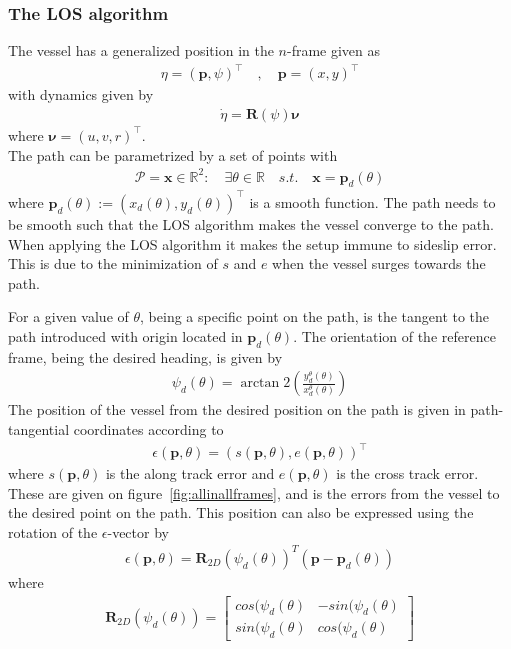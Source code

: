 \subsubsection{The \ac{LOS} algorithm}
The vessel has a generalized position in the ${n}$-frame given as
\begin{align}
\eta = (\textbf{p},\psi)^\top\quad , \quad \textbf{p} = (x,y)^\top
\end{align}
with dynamics given by
\begin{align}
\dot{\eta} = \textbf{R}(\psi)\boldsymbol{\nu}
\end{align}
where $\boldsymbol{\nu} = (u,v,r)^\top$.\\
The path can be parametrized by a set of points with
\begin{align}
\mathcal{P} = {\textbf{x}}\in\mathds{R}^2 : \quad \exists \theta \in \mathds{R} \quad s.t. \quad \textbf{x} = \textbf{p}_d(\theta)
\end{align}
where $\textbf{p}_d(\theta) := (x_d(\theta),y_d(\theta))^\top$ is a smooth function. The path needs to be smooth such that the \ac{LOS} algorithm makes the vessel converge to the path. When applying the \ac{LOS} algorithm it makes the setup immune to sideslip error. This is due to the minimization of $s$ and $e$ when the vessel surges towards the path.

For a given value of $\theta$, being a specific point on the path, is the tangent to the path introduced with origin located in $\textbf{p}_d(\theta)$. The orientation of the reference frame, being the desired heading, is given by
\begin{align}
\psi_d(\theta) = \arctan2\left(\frac{y_d^\theta(\theta)}{x_d^\theta(\theta)}\right)
\end{align}
The position of the vessel from the desired position on the path is given in path-tangential coordinates according to
\begin{align}
\epsilon(\textbf{p},\theta) = (s(\textbf{p},\theta),e(\textbf{p},\theta))^\top
\end{align}
where $s(\textbf{p},\theta)$ is the along track error and $e(\textbf{p},\theta)$ is the cross track error. These are given on figure~\vref{fig:allinallframes}, and is the errors from the vessel to the desired point on the path. This position can also be expressed using the rotation of the $\epsilon$-vector by
\begin{align}
\epsilon(\textbf{p},\theta) = \textbf{R}_{2D}(\psi_d(\theta))^T(\textbf{p}-\textbf{p}_d(\theta))
\end{align}
where
\begin{align}
\textbf{R}_{2D}(\psi_d(\theta)) = 
\begin{bmatrix}
cos(\psi_d(\theta) & -sin(\psi_d(\theta)\\
sin(\psi_d(\theta) & cos(\psi_d(\theta)
\end{bmatrix}
\end{align}
